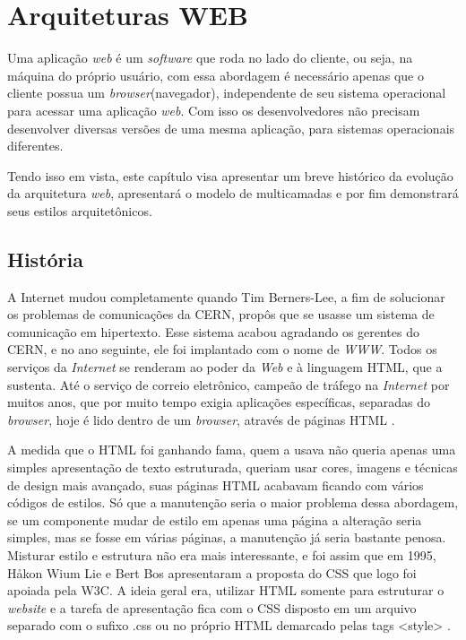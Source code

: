 
\chapter{\textbf{Arquiteturas  WEB}}
\label{c_cap2}

Uma aplicação \textit{web} é um \textit{software} que roda no lado do cliente, ou seja, na máquina do próprio usuário, com essa abordagem é necessário  apenas que o cliente possua um \textit{browser}(navegador), independente de seu sistema operacional para acessar uma aplicação \textit{web}. Com isso os desenvolvedores não precisam desenvolver diversas versões de uma mesma aplicação, para sistemas operacionais diferentes.

Tendo isso em vista, este capítulo visa apresentar um breve histórico da evolução da arquitetura  \textit{web}, apresentará o modelo de multicamadas e por fim demonstrará seus estilos arquitetônicos.

\section{História}


A Internet mudou completamente quando Tim Berners-Lee, a fim de solucionar os problemas de comunicações da \ac{CERN}, propôs que se usasse um sistema de comunicação em hipertexto. Esse sistema acabou agradando os gerentes do \ac{CERN}, e no ano seguinte, ele foi implantado com o nome de \textit{\ac{WWW}}. Todos os serviços da \textit{Internet} se renderam ao poder da \textit{Web} e à linguagem \ac{HTML}, que a sustenta. Até o serviço de correio eletrônico, campeão de tráfego na \textit{Internet} por muitos anos, que por muito tempo exigia aplicações específicas, separadas do \textit{browser}, hoje é lido dentro de um \textit{browser}, através de páginas \ac{HTML} \cite{rocha99}. 

A medida que o \ac{HTML} foi ganhando fama, quem a usava não queria apenas uma simples apresentação de texto estruturada, queriam usar cores, imagens e técnicas de design mais avançado, suas páginas \ac{HTML} acabavam ficando com vários códigos de estilos. Só que a manutenção seria o maior problema dessa abordagem, se um componente mudar de estilo em apenas uma página a alteração seria simples, mas se fosse em várias páginas, a manutenção já seria bastante penosa. Misturar estilo e estrutura não era mais interessante, e foi assim que em 1995, Håkon Wium Lie e Bert Bos apresentaram a proposta do \ac{CSS} que logo foi apoiada pela \ac{W3C}. A ideia geral era, utilizar \ac{HTML} somente para estruturar o \textit{website} e a tarefa de apresentação fica com o \ac{CSS} disposto em um arquivo separado com o sufixo .css ou no próprio \ac{HTML} demarcado pelas tags <style> \cite{devmediaCSS2018}.

